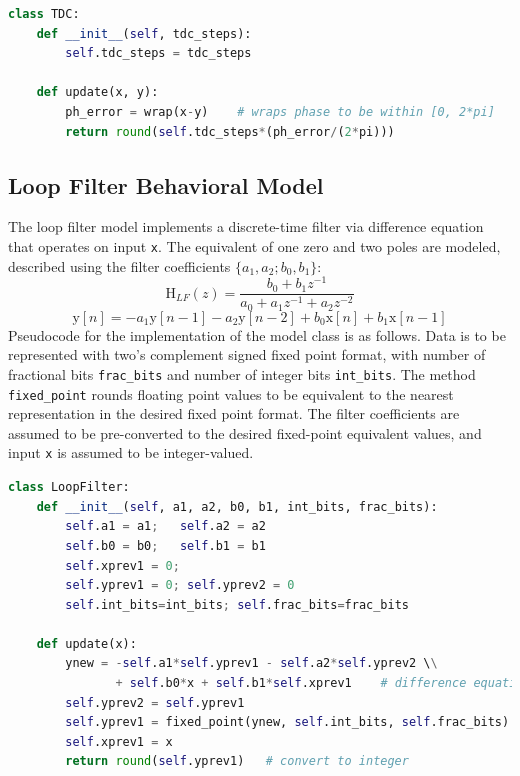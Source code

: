 \begin{lstlisting}[language={Python}, caption={TDC behavioral model Python pseudocode.}, label={tdc_code}]
class TDC:
	def __init__(self, tdc_steps):
		self.tdc_steps = tdc_steps

	def update(x, y):
		ph_error = wrap(x-y) 	# wraps phase to be within [0, 2*pi]
		return round(self.tdc_steps*(ph_error/(2*pi)))
\end{lstlisting}
\subsection{Loop Filter Behavioral Model}
The loop filter model implements a discrete-time filter via difference equation that operates on input \texttt{x}. The equivalent of one zero and two poles are modeled, described using the filter coefficients $\{a_1, a_2; b_0, b_1\}$:
\begin{equation}
\text{H}_{LF}(z) = \frac{b_0 + b_1z^{-1}}{a_0 + a_1z^{-1} + a_2z^{-2}}
\end{equation}
\begin{equation}
\text{y}[n] = -a_1 \text{y}[n-1]-a_2 \text{y}[n-2] + b_0\text{x}[n] + b_1\text{x}[n-1]
\end{equation}
Pseudocode for the implementation of the model class is as follows. Data is to be represented with two's complement signed fixed point format, with number of fractional bits \texttt{frac\_bits} and number of integer bits \texttt{int\_bits}. The method \texttt{fixed\_point} rounds floating point values to be equivalent to the nearest representation in the desired fixed point format. The filter coefficients are assumed to be pre-converted to the desired fixed-point equivalent values, and input \texttt{x} is assumed to be integer-valued.
\begin{lstlisting}[language={Python}, caption={Loop filter behavioral model Python pseudocode.}, label={lf_code}]
class LoopFilter:
	def __init__(self, a1, a2, b0, b1, int_bits, frac_bits):
		self.a1 = a1;	self.a2 = a2
		self.b0 = b0;	self.b1 = b1
		self.xprev1 = 0;	
		self.yprev1 = 0; self.yprev2 = 0
		self.int_bits=int_bits;	self.frac_bits=frac_bits

	def update(x):
		ynew = -self.a1*self.yprev1 - self.a2*self.yprev2 \\
			   + self.b0*x + self.b1*self.xprev1	# difference equation
		self.yprev2 = self.yprev1	
		self.yprev1 = fixed_point(ynew, self.int_bits, self.frac_bits)
		self.xprev1 = x
		return round(self.yprev1)	# convert to integer
\end{lstlisting}

